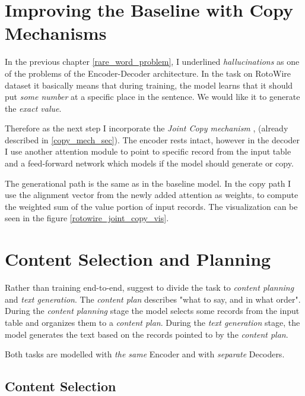 \section{Improving the Baseline with Copy Mechanisms} \label{section:copy_mechanism_intro}

In the previous chapter \ref{rare_word_problem}, I underlined \emph{hallucinations} as one of the problems of the Encoder-Decoder architecture. In the task on RotoWire dataset it basically means that during training, the model learns that it should put \emph{some number} at a specific place in the sentence. We would like it to generate the \emph{exact value}.

Therefore as the next step I incorporate the \emph{Joint Copy mechanism} \citep{gu2016incorporating}, \citep{yang2016referenceaware} (already described in \ref{copy_mech_sec}). The encoder rests intact, however in the decoder I use another attention module to point to specific record from the input table and a feed-forward network which models if the model should generate or copy.

The generational path is the same as in the baseline model. In the copy path I use the alignment vector from the newly added attention as weights, to compute the weighted sum of the value portion of input records. The visualization can be seen in the figure \ref{rotowire_joint_copy_vis}.

\section{Content Selection and Planning} \label{section:content_selection_and_planning}

Rather than training end-to-end, \citep{puduppully2019datatotext} suggest to divide the task to \emph{content planning} and \emph{text generation}. The \emph{content plan} describes "what to say, and in what order". During the \emph{content planning} stage the model selects some records from the input table and organizes them to a \emph{content plan}. During the \emph{text generation} stage, the model generates the text based on the records pointed to by the \emph{content plan}.

Both tasks are modelled with \emph{the same} Encoder and with \emph{separate} Decoders.

\subsection{Content Selection} \label{subsection:content_selection}

